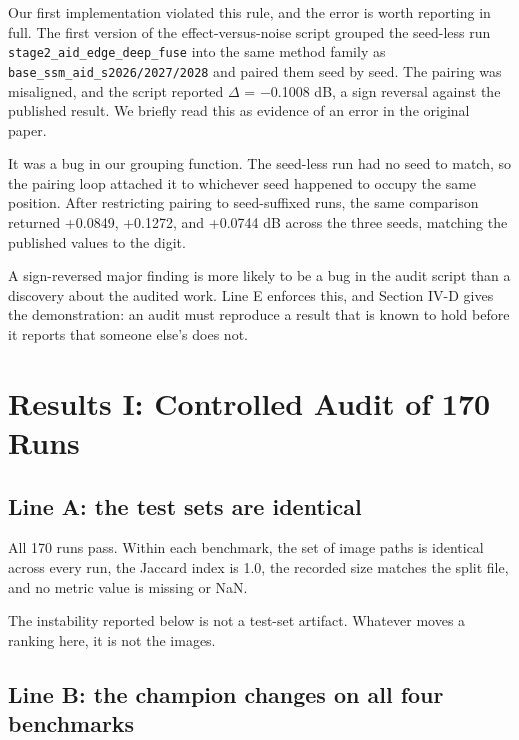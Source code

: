 \documentclass[journal,twoside,10pt]{IEEEtran}
\begin{document}
Our first implementation violated this rule, and the error is worth reporting in full. The first version of the effect-versus-noise script grouped the seed-less run \texttt{stage2\_aid\_edge\_deep\_fuse} into the same method family as \texttt{base\_ssm\_aid\_s2026/2027/2028} and paired them seed by seed. The pairing was misaligned, and the script reported $\Delta$ = $-$0.1008 dB, a sign reversal against the published result. We briefly read this as evidence of an error in the original paper.

It was a bug in our grouping function. The seed-less run had no seed to match, so the pairing loop attached it to whichever seed happened to occupy the same position. After restricting pairing to seed-suffixed runs, the same comparison returned +0.0849, +0.1272, and +0.0744 dB across the three seeds, matching the published values to the digit.

A sign-reversed major finding is more likely to be a bug in the audit script than a discovery about the audited work. Line E enforces this, and Section IV-D gives the demonstration: an audit must reproduce a result that is known to hold before it reports that someone else's does not.

\section{Results I: Controlled Audit of 170 Runs}


\subsection{Line A: the test sets are identical}


All 170 runs pass. Within each benchmark, the set of image paths is identical across every run, the Jaccard index is 1.0, the recorded size matches the split file, and no metric value is missing or NaN.

The instability reported below is not a test-set artifact. Whatever moves a ranking here, it is not the images.

\subsection{Line B: the champion changes on all four benchmarks}
\end{document}
